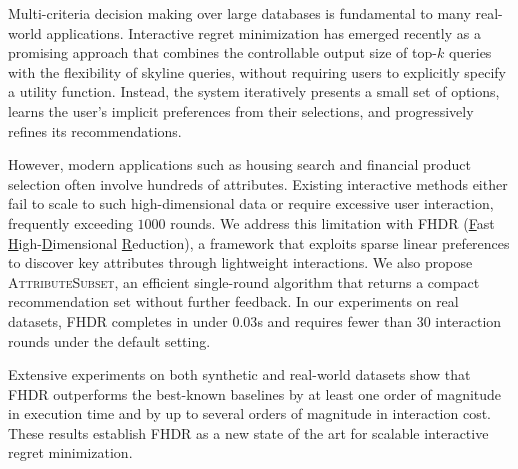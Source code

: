 Multi-criteria decision making over large databases is fundamental to many real-world applications. Interactive regret minimization has emerged recently as a promising approach that combines the controllable output size of top-$k$ queries with the flexibility of skyline queries, without requiring users to explicitly specify a utility function. Instead, the system iteratively presents a small set of options, learns the user’s implicit preferences from their selections, and progressively refines its recommendations.

However, modern applications such as housing search and financial product selection often involve hundreds of attributes. Existing interactive methods either fail to scale to such high-dimensional data or require excessive user interaction, frequently exceeding $1000$ rounds. We address this limitation with \textsc{FHDR} (\underline{F}ast \underline{H}igh-\underline{D}imensional \underline{R}eduction), a framework that exploits sparse linear preferences to discover key attributes through lightweight interactions. We also propose \textsc{AttributeSubset}, an efficient single-round algorithm that returns a compact recommendation set without further feedback. In our experiments on real datasets, \textsc{FHDR} completes in under $0.03$s and requires fewer than $30$ interaction rounds under the default setting.

Extensive experiments on both synthetic and real-world datasets show that \textsc{FHDR} outperforms the best-known baselines by at least one order of magnitude in execution time and by up to several orders of magnitude in interaction cost. These results establish \textsc{FHDR} as a new state of the art for scalable interactive regret minimization.

